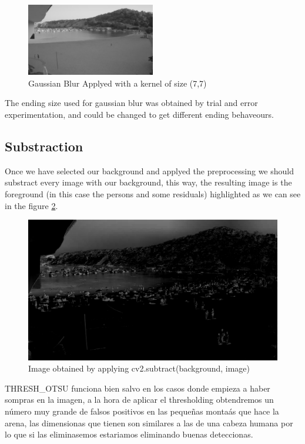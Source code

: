 \documentclass[10pt]{article}
\begin{document}
\begin{figure}[h]
    \centering
    \includegraphics[width=0.5\textwidth]{img/back_blur.png}
    \caption{Gaussian Blur Applyed with a kernel of size (7,7)}
    \label{fig:gaussian}
\end{figure}

The ending size used for gaussian blur was obtained by trial and error experimentation, and could be changed to get different ending behaveours.


\subsection*{Substraction}

Once we have selected our background and applyed the preprocessing we should substract every image with our background, this way, the resulting image is the foreground (in this case the persons and some residuals) highlighted as we can see in the figure \ref{fig:sub}. 

\begin{figure}
    \centering
    \includegraphics[width=\textwidth]{img/sub.jpg}
    \caption{Image obtained by applying cv2.subtract(background, image)}
    \label{fig:sub}
\end{figure}

THRESH\_OTSU funciona bien salvo en los casos donde empieza a haber sompras en la imagen, a la hora de aplicar el thresholding obtendremos un número muy grande de falsos positivos en las pequeñas montaás que hace la arena, las dimensionas que tienen son similares a las de una cabeza humana por lo que si las eliminasemos estariamos eliminando buenas deteccionas.
\end{document}
